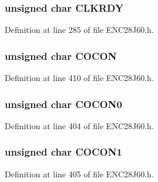 \hypertarget{union___r_e_g_a931d93dea449b5f13109f8e1695a2fec}{}
\subsubsection[{C\+L\+K\+R\+D\+Y}]{\setlength{\rightskip}{0pt plus 5cm}unsigned {\bf char} C\+L\+K\+R\+D\+Y}\label{union___r_e_g_a931d93dea449b5f13109f8e1695a2fec}


Definition at line 285 of file E\+N\+C28\+J60.\+h.

\hypertarget{union___r_e_g_af17c3e77fa17e60bc2b4059ccd79ade4}{}
\subsubsection[{C\+O\+C\+O\+N}]{\setlength{\rightskip}{0pt plus 5cm}unsigned {\bf char} C\+O\+C\+O\+N}\label{union___r_e_g_af17c3e77fa17e60bc2b4059ccd79ade4}


Definition at line 410 of file E\+N\+C28\+J60.\+h.

\hypertarget{union___r_e_g_aca9e07d7306113ec1ce9f26f2c4138ca}{}
\subsubsection[{C\+O\+C\+O\+N0}]{\setlength{\rightskip}{0pt plus 5cm}unsigned {\bf char} C\+O\+C\+O\+N0}\label{union___r_e_g_aca9e07d7306113ec1ce9f26f2c4138ca}


Definition at line 404 of file E\+N\+C28\+J60.\+h.

\hypertarget{union___r_e_g_a68d4daa1873ffc02c4bbc366cfc5510e}{}
\subsubsection[{C\+O\+C\+O\+N1}]{\setlength{\rightskip}{0pt plus 5cm}unsigned {\bf char} C\+O\+C\+O\+N1}\label{union___r_e_g_a68d4daa1873ffc02c4bbc366cfc5510e}


Definition at line 405 of file E\+N\+C28\+J60.\+h.

